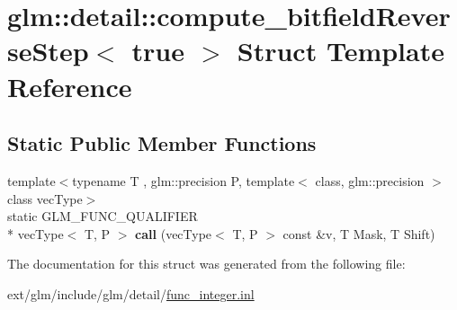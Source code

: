 \hypertarget{structglm_1_1detail_1_1compute__bitfield_reverse_step_3_01true_01_4}{\section{glm\-:\-:detail\-:\-:compute\-\_\-bitfield\-Reverse\-Step$<$ true $>$ Struct Template Reference}
\label{structglm_1_1detail_1_1compute__bitfield_reverse_step_3_01true_01_4}
}
\subsection*{Static Public Member Functions}
\begin{DoxyCompactItemize}
\item 
\hypertarget{structglm_1_1detail_1_1compute__bitfield_reverse_step_3_01true_01_4_a2923caf55050f8fc362ab476ec12bcc2}{{\footnotesize template$<$typename T , glm\-::precision P, template$<$ class, glm\-::precision $>$ class vec\-Type$>$ }\\static G\-L\-M\-\_\-\-F\-U\-N\-C\-\_\-\-Q\-U\-A\-L\-I\-F\-I\-E\-R \\*
vec\-Type$<$ T, P $>$ {\bfseries call} (vec\-Type$<$ T, P $>$ const \&v, T Mask, T Shift)}\label{structglm_1_1detail_1_1compute__bitfield_reverse_step_3_01true_01_4_a2923caf55050f8fc362ab476ec12bcc2}

\end{DoxyCompactItemize}


The documentation for this struct was generated from the following file\-:\begin{DoxyCompactItemize}
\item 
ext/glm/include/glm/detail/\hyperlink{func__integer_8inl}{func\-\_\-integer.\-inl}\end{DoxyCompactItemize}
